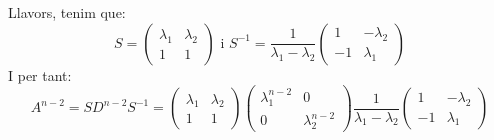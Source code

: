 Llavors, tenim que:
\[
S=
\begin{pmatrix}
\lambda_1 & \lambda_2 \\ 1 & 1
\end{pmatrix}
\text{ i }
S^{-1}=
\frac{1}{\lambda_1-\lambda_2}\begin{pmatrix}
1 & -\lambda_2 \\
-1 & \lambda_1
\end{pmatrix}
\]
I per tant:
\[
A^{n-2}=SD^{n-2}S^{-1}=
\begin{pmatrix}
\lambda_1 & \lambda_2 \\ 1 & 1
\end{pmatrix}
\begin{pmatrix}
\lambda_1^{n-2} & 0 \\
0 & \lambda_2^{n-2}
\end{pmatrix}
\frac{1}{\lambda_1-\lambda_2}\begin{pmatrix}
1 & -\lambda_2 \\
-1 & \lambda_1
\end{pmatrix}
\]
